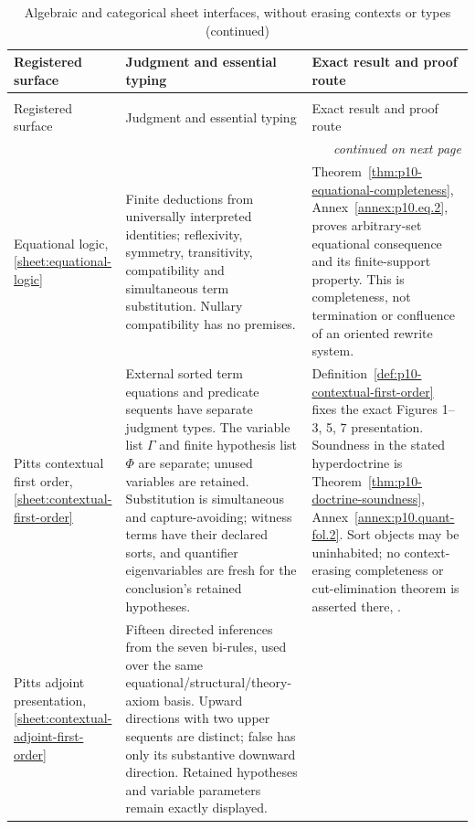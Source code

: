 \begingroup\small
\begin{longtable}{@{}p{.20\linewidth}p{.35\linewidth}p{.37\linewidth}@{}}
\caption{Algebraic and categorical sheet interfaces, without erasing contexts or types.}
\label{tab:p14-nonclassical-categorical}\\
\toprule
Registered surface & Judgment and essential typing & Exact result and proof route \\
\midrule\endfirsthead
\caption[]{Algebraic and categorical sheet interfaces, without erasing contexts or types (continued)}\\
\toprule Registered surface & Judgment and essential typing & Exact result and proof route \\
\midrule\endhead
\midrule\multicolumn{3}{r}{\emph{continued on next page}}\\
\endfoot
\endlastfoot
Equational logic, \ref{sheet:equational-logic} & Finite deductions from
universally interpreted identities; reflexivity, symmetry, transitivity,
compatibility and simultaneous term substitution. Nullary compatibility has
no premises. & Theorem~\ref{thm:p10-equational-completeness},
Annex~\ref{annex:p10.eq.2}, proves arbitrary-set equational consequence and
its finite-support property. This is completeness, not termination or
confluence of an oriented rewrite system. \\
\addlinespace
Pitts contextual first order, \ref{sheet:contextual-first-order} & External
sorted term equations and predicate sequents have separate judgment types.
The variable list \(\Gamma\) and finite hypothesis list \(\Phi\) are
separate; unused variables are retained. Substitution is simultaneous and
capture-avoiding; witness terms have their declared sorts, and quantifier
eigenvariables are fresh for the conclusion's retained hypotheses. &
Definition~\ref{def:p10-contextual-first-order} fixes the exact Figures
1--3, 5, 7 presentation. Soundness in the stated hyperdoctrine is
Theorem~\ref{thm:p10-doctrine-soundness},
Annex~\ref{annex:p10.quant-fol.2}. Sort objects may be uninhabited;
no context-erasing completeness or cut-elimination theorem is asserted
there, \cite{Pitts1995Draft}. \\
\addlinespace
Pitts adjoint presentation, \ref{sheet:contextual-adjoint-first-order} &
Fifteen directed inferences from the seven bi-rules, used over the same
equational/structural/theory-axiom basis. Upward directions with two upper
sequents are distinct; false has only its substantive downward direction.
Retained hypotheses and variable parameters remain exactly displayed. &

\end{longtable}
